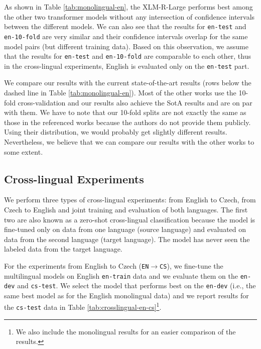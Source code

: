 \documentclass[10pt, a4paper]{article}
\begin{document}
\par As shown in Table \ref{tab:monolingual-en}, the XLM-R-Large performs best among the other two transformer models without any intersection of confidence intervals between the different models. We can also see that the results for \texttt{en-test} and \texttt{en-10-fold} are very similar and their confidence intervals overlap for the same model pairs (but different training data). 
Based on this observation, we assume that the results for \texttt{en-test} and \texttt{en-10-fold} are comparable to each other, thus in the cross-lingual experiments, English is evaluated only on the \texttt{en-test} part. 

\par We compare our results with the current state-of-the-art results (rows below the dashed line in Table \ref{tab:monolingual-en}). Most of the other works use the 10-fold cross-validation and our results also achieve the SotA results and are on par with them. We have to note that our 10-fold splits are not exactly the same as those in the referenced works because the authors do not provide them publicly. Using their distribution, we would probably get slightly different results. Nevertheless, we believe that we can compare our results with the other works to some extent.




\subsection{Cross-lingual Experiments}
We perform three types of cross-lingual experiments: from English to Czech, from Czech to English and joint training and evaluation of both languages. The first two are also known as a zero-shot cross-lingual classification because the model is fine-tuned only on data from one language (source language) and evaluated on data from the second language (target language). The model has never seen the labeled data from the target language.

\par For the experiments from English to Czech (\texttt{EN$\rightarrow$CS}), we fine-tune the multilingual models on English \texttt{en-train} data and we evaluate them on the \texttt{en-dev} and \texttt{cs-test}. We select the model that performs best on the \texttt{en-dev} (i.e., the same best model as for the English monolingual data) and we report results for the \texttt{cs-test} data in Table \ref{tab:crosslingual-en-cs}\footnote{We also include the monolingual results for an easier comparison of the results.}.
\end{document}
